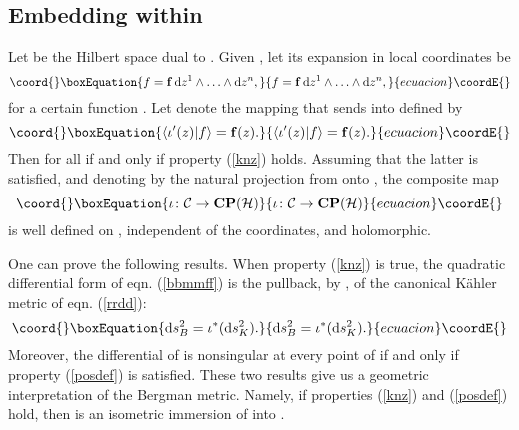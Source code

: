 \documentclass[a4paper,a4paper]{article}
\begin{document}
\subsection{Embedding \coordHE{} within \coordHE{}}\label{fedemb}


Let \coordHE{} be the Hilbert space dual to \coordHE{}. Given \coordHE{}, let its expansion 
in local coordinates be
\begin{equation}\coord{}\boxEquation{
f={\bf f}\,{\rm d}z^1\wedge\ldots\wedge{\rm d}z^n,
\label{ppxx}
}{
f={\bf f}\,{\rm d}z^1\wedge\ldots\wedge{\rm d}z^n,
}{ecuacion}\coordE{}\end{equation}
for a certain function \coordHE{}. Let \coordHE{} denote the mapping that sends \coordHE{} 
into \coordHE{} defined by
\begin{equation}\coord{}\boxEquation{
\langle\iota'(z)|f\rangle = {\bf f}(z).
\label{hhaa}
}{
\langle\iota'(z)|f\rangle = {\bf f}(z).
}{ecuacion}\coordE{}\end{equation}
Then \coordHE{} for all \coordHE{} if and only if property (\ref{knz}) holds. 
Assuming that the latter is satisfied, and denoting by \coordHE{} the natural projection from 
\coordHE{} onto \coordHE{}, the composite map \coordHE{} 
\begin{equation}\coord{}\boxEquation{
\iota\colon{\cal C}\rightarrow{\bf CP}({\cal H})
\label{ccmmppp}
}{
\iota\colon{\cal C}\rightarrow{\bf CP}({\cal H})
}{ecuacion}\coordE{}\end{equation}
is well defined on \coordHE{}, independent of the coordinates, and holomorphic. 

One can prove the following results. When property (\ref{knz}) is true, the 
quadratic differential form \coordHE{} of eqn. (\ref{bbmmff}) is the pullback, 
by \myHighlight{$\iota$}\coordHE{}, of the canonical K\"ahler metric \coordHE{} of eqn. (\ref{rrdd}):
\begin{equation}\coord{}\boxEquation{
{\rm d}s^2_B = \iota^*({\rm d}s^2_K).
\label{ppbbck}
}{
{\rm d}s^2_B = \iota^*({\rm d}s^2_K).
}{ecuacion}\coordE{}\end{equation}
Moreover, the differential of \myHighlight{$\iota$}\coordHE{} is nonsingular at every point 
of \coordHE{} if and only if property (\ref{posdef}) is satisfied. 
These two results give us a geometric interpretation of the Bergman metric. 
Namely, if properties (\ref{knz}) and (\ref{posdef}) hold, 
then \myHighlight{$\iota$}\coordHE{} is an isometric immersion of \coordHE{} into \coordHE{}.
\end{document}
